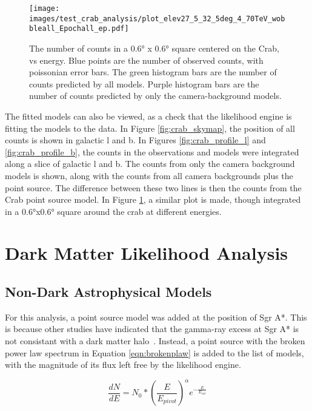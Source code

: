     \begin{figure}[h]
      \centering
      \texttt{[image: images/test\_crab\_analysis/plot\_elev27\_5\_32\_5deg\_4\_70TeV\_wobbleall\_Epochall\_ep.pdf]}
      \caption[Crab Profile in Energy]
      {
        The number of counts in a \ang{0.6} x \ang{0.6} square centered on the Crab, vs energy.
        Blue points are the number of observed counts, with poissonian error bars.
        The green histogram bars are the number of counts predicted by all models.
        Purple histogram bars are the number of counts predicted by only the camera-background models.
      }
      \label{fig:crab_profile_energy}
    \end{figure}
    
    The fitted models can also be viewed, as a check that the likelihood engine is fitting the models to the data.
    In Figure \ref{fig:crab_skymap}, the position of all counts is shown in galactic l and b.
    In Figures \ref{fig:crab_profile_l} and \ref{fig:crab_profile_b}, the counts in the observations and models were integrated along a slice of galactic l and b.
    The counts from only the camera background models is shown, along with the counts from all camera backgrounds plus the point source.
    The difference between these two lines is then the counts from the Crab point source model.
    In Figure \ref{fig:crab_profile_energy}, a similar plot is made, though integrated in a \ang{0.6}x\ang{0.6} square around the crab at different energies.

    \FloatBarrier

\section{Dark Matter Likelihood Analysis}
  
  \subsection{Non-Dark Astrophysical Models}
  For this analysis, a point source model was added at the position of Sgr A*.
  This is because other studies have indicated that the gamma-ray excess at Sgr A* is not consistant with a dark matter halo~\cite{gc_pnt_is_not_dm1, gc_pnt_is_not_dm2, gc_pnt_is_not_dm3}.
  Instead, a point source with the broken power law spectrum in Equation \ref{eqn:brokenplaw} is added to the list of models, with the magnitude of its flux left free by the likelihood engine.
  
  \begin{equation}\label{eqn:brokenplaw}
    \frac{dN}{dE} = N_{0} * { \left ( \frac{E}{E_{pivot}} \right ) }^{\alpha} {e}^{-\frac{E}{E_{cut}}}
  \end{equation}
  
